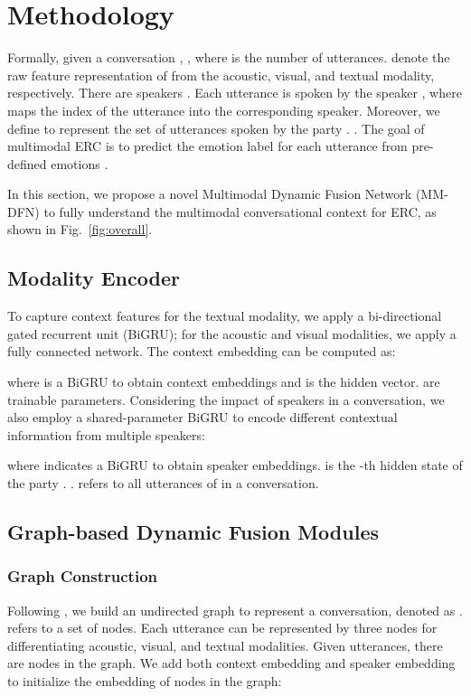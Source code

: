 \documentclass{article}
\begin{document}
\section{Methodology}


Formally, given a conversation , , where  is the number of utterances. 
 denote the raw feature representation of  from the acoustic, visual, and textual modality, respectively.
There are  speakers .
Each utterance  is spoken by the speaker , where  maps the index of the utterance into the corresponding speaker.
Moreover, we define  to represent the set of utterances spoken by the party .
.
The goal of multimodal ERC is to predict the emotion label  for each utterance  from pre-defined emotions .

In this section, we propose a novel Multimodal Dynamic Fusion Network (MM-DFN) to fully understand the multimodal conversational context for ERC,
as shown in Fig.~\ref{fig:overall}.





\subsection{Modality Encoder}
To capture context features for the textual modality, we apply a bi-directional gated recurrent unit (BiGRU); for the acoustic and visual modalities, we apply a  fully connected network. The context embedding can be computed as: 
 
where  is a BiGRU to obtain context embeddings and  is the hidden vector.  
 are trainable parameters.
Considering the impact of speakers in a conversation, we also employ a shared-parameter BiGRU to encode different contextual information from multiple speakers:
  
where  indicates a BiGRU to obtain speaker embeddings. 
 is the -th hidden state of the party . . 
 refers to all utterances of  in a conversation.  

 


\subsection{Graph-based Dynamic Fusion Modules}
\subsubsection{Graph Construction}
Following \cite{DBLP:conf/acl/HuLZJ20}, we build an undirected graph to represent a conversation, denoted as .
 refers to a set of nodes. Each utterance can be represented by three nodes for differentiating acoustic, visual, and textual modalities. Given  utterances, there are  nodes in the graph.
We add both context embedding and speaker embedding to initialize the embedding of nodes in the graph:
 
\end{document}
